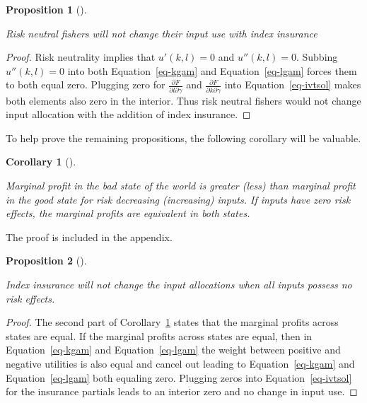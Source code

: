 \documentclass[
  super,
  preprint,
  3p]{elsarticle}
\theoremstyle{plain}
\newtheorem{proposition}{Proposition}[section]
\theoremstyle{plain}
\newtheorem{corollary}{Corollary}[section]
\theoremstyle{remark}
\begin{document}
\begin{proposition}[]\protect\hypertarget{prp-rn}{}\label{prp-rn}

Risk neutral fishers will not change their input use with index
insurance

\end{proposition}

\begin{proof}

Risk neutrality implies that \(u'(k,l)=0\) and \(u''(k,l)=0\). Subbing
\(u''(k,l)=0\) into both Equation~\ref{eq-kgam} and
Equation~\ref{eq-lgam} forces them to both equal zero. Plugging zero for
\(\frac{\partial F}{\partial l \partial \gamma}\) and
\(\frac{\partial F}{\partial k \partial \gamma}\) into
Equation~\ref{eq-ivtsol} makes both elements also zero in the interior.
Thus risk neutral fishers would not change input allocation with the
addition of index insurance.

\end{proof}

To help prove the remaining propositions, the following corollary will
be valuable.

\begin{corollary}[]\protect\hypertarget{cor-mp}{}\label{cor-mp}

Marginal profit in the bad state of the world is greater (less) than
marginal profit in the good state for risk decreasing (increasing)
inputs. If inputs have zero risk effects, the marginal profits are
equivalent in both states.

\end{corollary}

The proof is included in the appendix.

\begin{proposition}[]\protect\hypertarget{prp-rezero}{}\label{prp-rezero}

Index insurance will not change the input allocations when all inputs
possess no risk effects.

\end{proposition}

\begin{proof}

The second part of Corollary~\ref{cor-mp} states that the marginal
profits across states are equal. If the marginal profits across states
are equal, then in Equation~\ref{eq-kgam} and Equation~\ref{eq-lgam} the
weight between positive and negative utilities is also equal and cancel
out leading to Equation~\ref{eq-kgam} and Equation~\ref{eq-lgam} both
equaling zero. Plugging zeros into Equation~\ref{eq-ivtsol} for the
insurance partials leads to an interior zero and no change in input use.

\end{proof}
\end{document}

